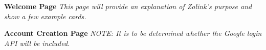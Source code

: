 \documentclass[12pt]{article}%
\begin{document}
\begin{center}
    {\bf \Large Welcome Page}
    {\it This page will provide an explanation of Zolink's purpose and show a few example cards.}
    
    \clearpage
    {\bf \Large Account Creation Page}
    {\it NOTE: It is to be determined whether the Google login API will be included.}
    

\end{center}
\end{document}
